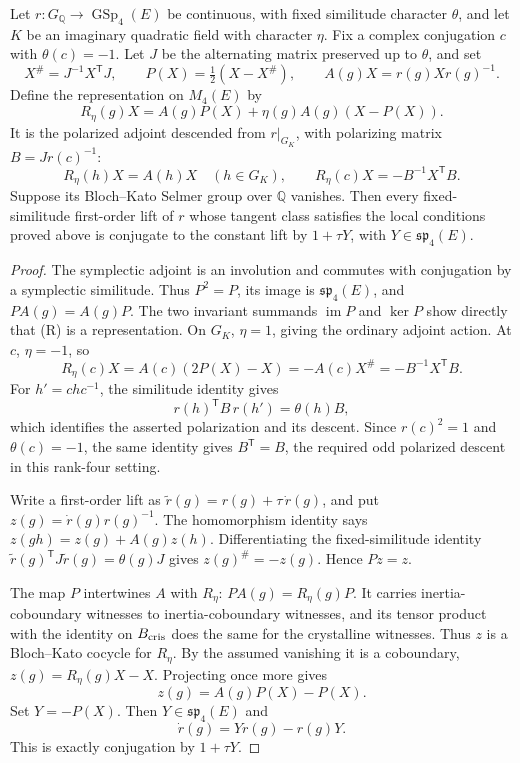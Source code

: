 \begin{srproposition}\label{prop:sr-polarized-symplectic-rigidity}
Let \(r:G_{\mathbb Q}\to\operatorname{GSp}_4(E)\) be continuous,
with fixed similitude character \(\theta\), and let \(K\) be an
imaginary quadratic field with character \(\eta\).
Fix a complex conjugation \(c\) with \(\theta(c)=-1\).
Let \(J\) be the alternating matrix preserved up to \(\theta\), and set
\[
 X^\#=J^{-1}X^{\mathsf T}J,\qquad
 P(X)=\tfrac12(X-X^\#),\qquad
 A(g)X=r(g)Xr(g)^{-1}.
\]
Define the representation on \(M_4(E)\) by
\[
 R_\eta(g)X=A(g)P(X)+\eta(g)A(g)(X-P(X)).
 \tag{R}
\]
It is the polarized adjoint descended from \(r|_{G_K}\), with
polarizing matrix \(B=Jr(c)^{-1}\):
\[
 R_\eta(h)X=A(h)X\quad(h\in G_K),\qquad
 R_\eta(c)X=-B^{-1}X^{\mathsf T}B.
\]
Suppose its Bloch--Kato Selmer group over \(\mathbb Q\) vanishes.
Then every fixed-similitude first-order lift of \(r\) whose tangent
class satisfies the local conditions proved above is conjugate
to the constant lift by \(1+\tau Y\), with \(Y\in\mathfrak{sp}_4(E)\).
\end{srproposition}
\begin{proof}
The symplectic adjoint is an involution and commutes with
conjugation by a symplectic similitude. Thus \(P^2=P\),
its image is \(\mathfrak{sp}_4(E)\), and
\(P A(g)=A(g)P\).
The two invariant summands \(\operatorname{im}P\) and \(\ker P\)
show directly that (R) is a representation.
On \(G_K\), \(\eta=1\), giving the ordinary adjoint action.
At \(c\), \(\eta=-1\), so
\[
 R_\eta(c)X=A(c)(2P(X)-X)=-A(c)X^\#
                                      =-B^{-1}X^{\mathsf T}B.
\]
For \(h'=chc^{-1}\), the similitude identity gives
\[
                  r(h)^{\mathsf T}B\,r(h')=\theta(h)B,
\]
which identifies the asserted polarization and its descent.
Since \(r(c)^2=1\) and \(\theta(c)=-1\), the same identity gives
\(B^{\mathsf T}=B\), the required odd polarized descent in this
rank-four setting.

Write a first-order lift as
\(\widetilde r(g)=r(g)+\tau\,\dot r(g)\), and put
\(z(g)=\dot r(g)r(g)^{-1}\).
The homomorphism identity says
\(z(gh)=z(g)+A(g)z(h)\).
Differentiating the fixed-similitude identity
\(\widetilde r(g)^{\mathsf T}J\widetilde r(g)=\theta(g)J\)
gives \(z(g)^\#=-z(g)\). Hence \(Pz=z\).

The map \(P\) intertwines \(A\) with \(R_\eta\):
\(P A(g)=R_\eta(g)P\).
It carries inertia-coboundary witnesses to inertia-coboundary
witnesses, and its tensor product with the identity on
\(B_{\rm cris}\) does the same for the crystalline witnesses.
Thus \(z\) is a Bloch--Kato cocycle for \(R_\eta\).
By the assumed vanishing it is a coboundary,
\(z(g)=R_\eta(g)X-X\).
Projecting once more gives
\[
                    z(g)=A(g)P(X)-P(X).
\]
Set \(Y=-P(X)\). Then \(Y\in\mathfrak{sp}_4(E)\) and
\[
                    \dot r(g)=Yr(g)-r(g)Y.
\]
This is exactly conjugation by \(1+\tau Y\).
\end{proof}

